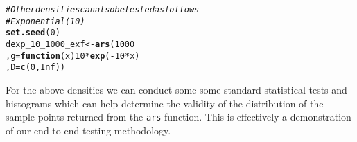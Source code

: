 \documentclass{article}\usepackage[]{graphicx}\usepackage[]{color}
\makeatletter
\newcommand{\hlnum}[1]{\textcolor[rgb]{0.686,0.059,0.569}{#1}}%
\newcommand{\hlcom}[1]{\textcolor[rgb]{0.678,0.584,0.686}{\textit{#1}}}%
\newcommand{\hlopt}[1]{\textcolor[rgb]{0,0,0}{#1}}%
\newcommand{\hlstd}[1]{\textcolor[rgb]{0.345,0.345,0.345}{#1}}%
\newcommand{\hlkwa}[1]{\textcolor[rgb]{0.161,0.373,0.58}{\textbf{#1}}}%
\newcommand{\hlkwb}[1]{\textcolor[rgb]{0.69,0.353,0.396}{#1}}%
\newcommand{\hlkwc}[1]{\textcolor[rgb]{0.333,0.667,0.333}{#1}}%
\newcommand{\hlkwd}[1]{\textcolor[rgb]{0.737,0.353,0.396}{\textbf{#1}}}%
\newenvironment{kframe}{%
 \def\at@end@of@kframe{}%
 \ifinner\ifhmode%
  \def\at@end@of@kframe{\end{minipage}}%
  \begin{minipage}{\columnwidth}%
 \fi\fi%
 \def\FrameCommand##1{\hskip\@totalleftmargin \hskip-\fboxsep
 \colorbox{shadecolor}{##1}\hskip-\fboxsep
     \hskip-\linewidth \hskip-\@totalleftmargin \hskip\columnwidth}%
 \MakeFramed {\advance\hsize-\width
   \@totalleftmargin\z@ \linewidth\hsize
   \@setminipage}}%
 {\par\unskip\endMakeFramed%
 \at@end@of@kframe}
\newenvironment{knitrout}{}{} %
\makeatother
\begin{document}
\begin{knitrout}
\begin{kframe}
\begin{alltt}
 \hlcom{# Other densities can also be tested as follows}
 \hlcom{# Exponential(10)}
 \hlkwd{set.seed}\hlstd{(}\hlnum{0}\hlstd{)}
 \hlstd{dexp_10_1000_exf} \hlkwb{<-} \hlkwd{ars}\hlstd{(}\hlnum{1000}
                         \hlstd{,} \hlkwc{g} \hlstd{=} \hlkwa{function}\hlstd{(}\hlkwc{x}\hlstd{)} \hlnum{10}\hlopt{*}\hlkwd{exp}\hlstd{(}\hlopt{-}\hlnum{10}\hlopt{*}\hlstd{x)}
                         \hlstd{,} \hlkwc{D}\hlstd{=}\hlkwd{c}\hlstd{(}\hlnum{0}\hlstd{,} \hlnum{Inf}\hlstd{))}
\end{alltt}
\end{kframe}
\end{knitrout}

For the above densities we can conduct some some standard statistical tests and 
histograms which can help determine the validity of the distribution of the sample 
points returned from the \texttt{ars} function. This is effectively a demonstration of 
our end-to-end testing methodology.
\end{document}
